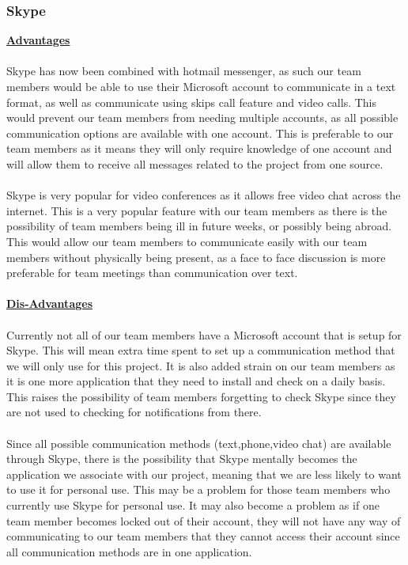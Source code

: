 \documentclass{l3proj}
\begin{document}
\subsubsection{Skype}
\textbf {\underline{Advantages}}\\
\\
Skype has now been combined with hotmail messenger, as such our team members would be able to use their Microsoft account to communicate in a text format, as well as communicate using skips call feature and video calls. This would prevent our team members from needing multiple accounts, as all possible communication options are available with one account. This is preferable to our team members as it means they will only require knowledge of one account and will allow them to receive all messages related to the project from one source.\\
\\
Skype is very popular for video conferences as it allows free video chat across the internet. This is a very popular feature with our team members as there is the possibility of team members being ill in future weeks, or possibly being abroad. This would allow our team members to communicate easily with our team members without physically being present, as a face to face discussion is more preferable for team meetings than communication over text. \\
\\
\textbf {\underline{Dis-Advantages}}\\
\\
Currently not all of our team members have a Microsoft account that is setup for Skype. This will mean extra time spent to set up a communication method that we will only use for this project. It is also added strain on our team members as it is one more application that they need to install and check on a daily basis. This raises the possibility of team members forgetting to check Skype since they are not used to checking for notifications from there.\\
\\
Since all possible communication methods (text,phone,video chat) are available through Skype, there is the possibility that Skype mentally becomes the application we associate with our project, meaning that we are less likely to want to use it for personal use. This may be a problem for those team members who currently use Skype for personal use. It may also become a problem as if one team member becomes locked out of their account, they will not have any way of communicating to our team members that they cannot access their account since all communication methods are in one application. \\
\end{document}
